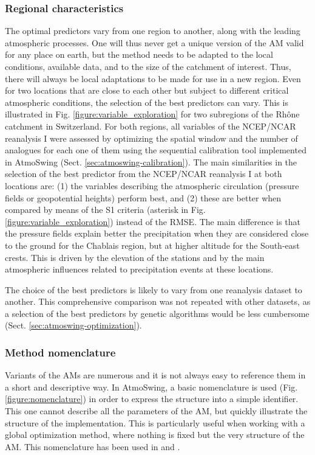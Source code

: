 \documentclass[review]{elsarticle}
\begin{document}
\subsubsection{Regional characteristics}

The optimal predictors vary from one region to another, along with the leading atmospheric processes. One will thus never get a unique version of the AM valid for any place on earth, but the method needs to be adapted to the local conditions, available data, and to the size of the catchment of interest. Thus, there will always be local adaptations to be made for use in a new region. Even for two locations that are close to each other but subject to different critical atmospheric conditions, the selection of the best predictors can vary. This is illustrated in Fig. \ref{figure:variable_exploration} for two subregions of the Rh\^{o}ne catchment in Switzerland. For both regions, all variables of the NCEP/NCAR reanalysis I were assessed by optimizing the spatial window and the number of analogues for each one of them using the sequential calibration tool implemented in AtmoSwing (Sect. \ref{sec:atmoswing-calibration}). The main similarities in the selection of the best predictor from the NCEP/NCAR reanalysis I at both locations are: (1) the variables describing the atmospheric circulation (pressure fields or geopotential heights) perform best, and (2) these are better when compared by means of the S1 criteria (asterisk in Fig. \ref{figure:variable_exploration}) instead of the RMSE. The main difference is that the pressure fields explain better the precipitation when they are considered close to the ground for the Chablais region, but at higher altitude for the South-east crests. This is driven by the elevation of the stations and by the main atmospheric influences related to precipitation events at these locations. 

The choice of the best predictors is likely to vary from one reanalysis dataset to another. This comprehensive comparison was not repeated with other datasets, as a selection of the best predictors by genetic algorithms would be less cumbersome (Sect. \ref{sec:atmoswing-optimization}).


\subsubsection{Method nomenclature}

Variants of the AMs are numerous and it is not always easy to reference them in a short and descriptive way. In AtmoSwing, a basic nomenclature is used (Fig. \ref{figure:nomenclature}) in order to express the structure into a simple identifier. This one cannot describe all the parameters of the AM, but quickly illustrate the structure of the implementation. This is particularly useful when working with a global optimization method, where nothing is fixed but the very structure of the AM. This nomenclature has been used in \citet{Horton2017a, Horton2017b, Horton2018a} and \citet{Horton2018b}.
\end{document}
